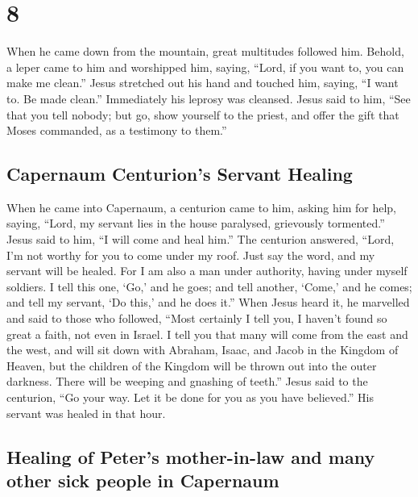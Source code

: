 \hypertarget{section-7}{%
\section{8}\label{section-7}}

 When he came down from the mountain, great multitudes
followed him.  Behold, a leper came to him and worshipped
him, saying, ``Lord, if you want to, you can make me clean.''
 Jesus stretched out his hand and touched him, saying, ``I
want to. Be made clean.'' Immediately his leprosy was cleansed.
 Jesus said to him, ``See that you tell nobody; but go,
show yourself to the priest, and offer the gift that Moses commanded, as
a testimony to them.''

\hypertarget{capernaum-centurions-servant-healing}{%
\subsection{Capernaum Centurion's Servant
Healing}\label{capernaum-centurions-servant-healing}}

 When he came into Capernaum, a centurion came to him,
asking him for help,  saying, ``Lord, my servant lies in
the house paralysed, grievously tormented.''  Jesus said
to him, ``I will come and heal him.''  The centurion
answered, ``Lord, I'm not worthy for you to come under my roof. Just say
the word, and my servant will be healed.  For I am also a
man under authority, having under myself soldiers. I tell this one,
`Go,' and he goes; and tell another, `Come,' and he comes; and tell my
servant, `Do this,' and he does it.''  When Jesus heard
it, he marvelled and said to those who followed, ``Most certainly I tell
you, I haven't found so great a faith, not even in Israel.
 I tell you that many will come from the east and the
west, and will sit down with Abraham, Isaac, and Jacob in the Kingdom of
Heaven,  but the children of the Kingdom will be thrown
out into the outer darkness. There will be weeping and gnashing of
teeth.''  Jesus said to the centurion, ``Go your way. Let
it be done for you as you have believed.'' His servant was healed in
that hour.

\hypertarget{healing-of-peters-mother-in-law-and-many-other-sick-people-in-capernaum}{%
\subsection{Healing of Peter's mother-in-law and many other sick people
in
Capernaum}\label{healing-of-peters-mother-in-law-and-many-other-sick-people-in-capernaum}}

